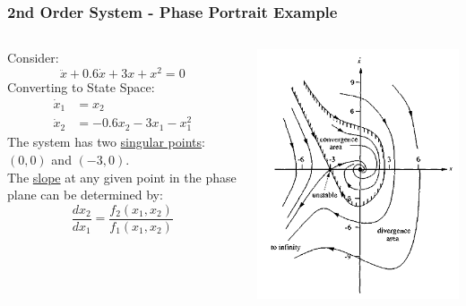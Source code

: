 \documentclass[11pt,handout]{beamer}   %
\begin{document}
\begin{frame}
\frametitle{2nd Order System - Phase Portrait Example}
\begin{columns}
\begin{column}{0.5\textwidth}
Consider:
\begin{equation}
\ddot{x} + 0.6\dot{x}+3x+x^2 = 0
\end{equation}
Converting to State Space:
\begin{equation}
\begin{aligned}
\dot{x}_1 &= x_2\\
\dot{x}_2 &= -0.6x_2-3x_1-x_1^2
\end{aligned}
\end{equation}
The system has two \underline{singular points}: $(0,0)$ and $(-3,0)$.\\The \underline{slope} at any given point in the phase plane can be determined by:
\begin{equation}
\frac{dx_2}{dx_1} = \frac{f_2(x_1,x_2)}{f_1(x_1,x_2)}
\end{equation}
\end{column}
\begin{column}{0.5\textwidth}
\includegraphics[width=\textwidth]{Figures/Example_2.PNG}
\end{column}
\end{columns}
\end{frame}
\end{document}
